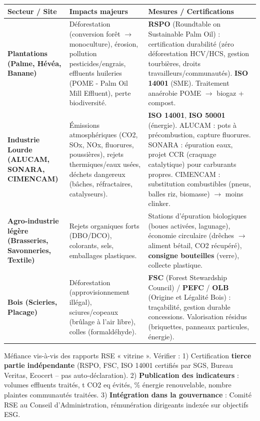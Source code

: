 \documentclass[11pt]{article}
\begin{document}
\begin{exemplebox}
\begin{center}
\begin{tabularx}{\linewidth}{|l|X|X|}\hline
\textbf{Secteur / Site} & \textbf{Impacts majeurs} & \textbf{Mesures / Certifications} \\ \hline
\textbf{Plantations (Palme, Hévéa, Banane)} & Déforestation (conversion forêt $\to$ monoculture), érosion, pollution pesticides/engrais, effluents huileries (POME - Palm Oil Mill Effluent), perte biodiversité. & \textbf{RSPO} (Roundtable on Sustainable Palm Oil) : certification durabilité (zéro déforestation HCV/HCS, gestion tourbières, droits travailleurs/communautés). \textbf{ISO 14001} (SME). Traitement anaérobie POME $\to$ biogaz + compost. \\ \hline
\textbf{Industrie Lourde (ALUCAM, SONARA, CIMENCAM)} & Émissions atmosphériques (CO2, SOx, NOx, fluorures, poussières), rejets thermiques/eaux usées, déchets dangereux (bâches, réfractaires, catalyseurs). & \textbf{ISO 14001}, \textbf{ISO 50001} (énergie). ALUCAM : pots à précombustion, capture fluorures. SONARA : épuration eaux, projet CCR (craquage catalytique) pour carburants propres. CIMENCAM : substitution combustibles (pneus, balles riz, biomasse) $\to$ moins clinker. \\ \hline
\textbf{Agro-industrie légère (Brasseries, Savonneries, Textile)} & Rejets organiques forts (DBO/DCO), colorants, sels, emballages plastiques. & Stations d'épuration biologiques (boues activées, lagunage), économie circulaire (drêches $\to$ aliment bétail, CO2 récupéré), \textbf{consigne bouteilles} (verre), collecte plastique. \\ \hline
\textbf{Bois (Scieries, Placage)} & Déforestation (approvisionnement illégal), sciures/copeaux (brûlage à l'air libre), colles (formaldéhyde). & \textbf{FSC} (Forest Stewardship Council) / \textbf{PEFC} / \textbf{OLB} (Origine et Légalité Bois) : traçabilité, gestion durable concessions. Valorisation résidus (briquettes, panneaux particules, énergie). \\ \hline
\end{tabularx}
\end{center}
\end{exemplebox}

\begin{attention}
Méfiance vis-à-vis des rapports RSE « vitrine ». Vérifier : 1) Certification \textbf{tierce partie indépendante} (RSPO, FSC, ISO 14001 certifiés par SGS, Bureau Veritas, Ecocert -- pas auto-déclaration). 2) \textbf{Publication des indicateurs} : volumes effluents traités, t CO2 eq évités, \% énergie renouvelable, nombre plaintes communautés traitées. 3) \textbf{Intégration dans la gouvernance} : Comité RSE au Conseil d'Administration, rémunération dirigeants indexée sur objectifs ESG.
\end{attention}
\end{document}
